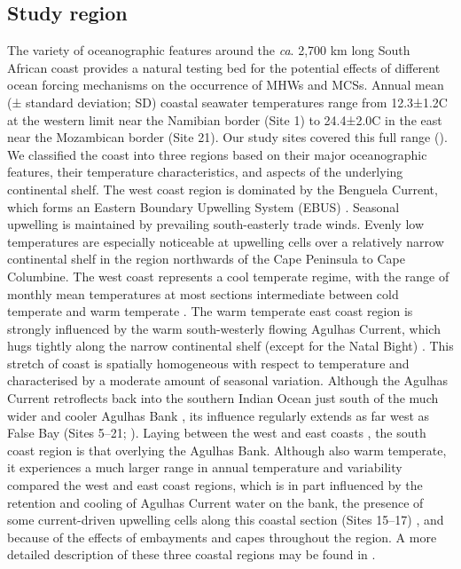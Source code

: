 \documentclass[a4paper,10pt,review]{elsarticle}
\begin{document}
\subsection{Study region}
The variety of oceanographic features around the \emph{ca}. 2,700 km long South African coast provides a natural testing bed for the potential effects of different ocean forcing mechanisms on the occurrence of MHWs and MCSs. Annual mean (± standard deviation; SD) coastal seawater temperatures range from 12.3±1.2\degree C at the western limit near the Namibian border (Site 1) to 24.4±2.0\degree C in the east near the Mozambican border (Site 21). Our study sites covered this full range (). We classified the coast into three regions based on their major oceanographic features, their temperature characteristics, and aspects of the underlying continental shelf. The west coast region is dominated by the Benguela Current, which forms an Eastern Boundary Upwelling System (EBUS) \citep{Hutchings2009}. Seasonal upwelling is maintained by prevailing south-easterly trade winds. Evenly low temperatures are especially noticeable at upwelling cells over a relatively narrow continental shelf in the region northwards of the Cape Peninsula to Cape Columbine. The west coast represents a cool temperate regime, with the range of monthly mean temperatures at most sections intermediate between cold temperate and warm temperate \citep{Luning1990}. The warm temperate east coast region is strongly influenced by the warm south-westerly flowing Agulhas Current, which hugs tightly along the narrow continental shelf (except for the Natal Bight) \citep{Luning1990}. This stretch of coast is spatially homogeneous with respect to temperature and characterised by a moderate amount of seasonal variation. Although the Agulhas Current retroflects back into the southern Indian Ocean \citep{Hutchings2009} just south of the much wider and cooler Agulhas Bank \citep{Roberts2005}, its influence regularly extends as far west as False Bay (Sites 5--21; ). Laying between the west and east coasts , the south coast region is that overlying the Agulhas Bank. Although also warm temperate, it experiences a much larger range in annual temperature and variability compared the west and east coast regions, which is in part influenced by the retention and cooling of Agulhas Current water on the bank, the presence of some current-driven upwelling cells along this coastal section (Sites 15--17) \citep{Roberts2005}, and because of the effects of embayments and capes throughout the region. A more detailed description of these three coastal regions may be found in \citet{Smit2013}.
\end{document}
